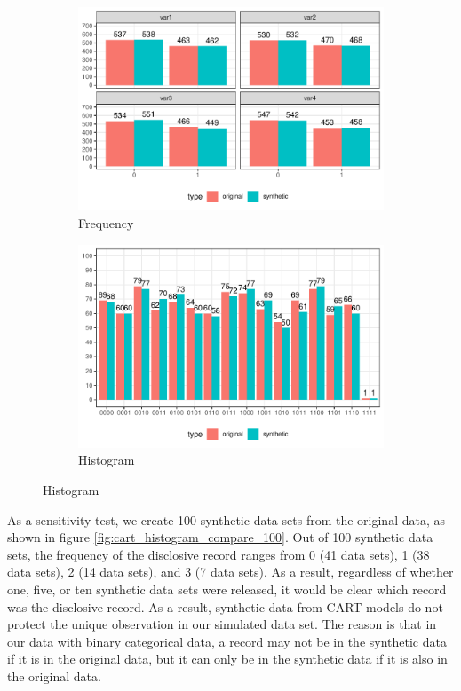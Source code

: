 \documentclass[runningheads]{llncs}
\begin{document}
\begin{figure}[!h]
    \centering
    \caption{Compare original and synthetic data}
    \begin{subfigure}{0.48\textwidth}
        \includegraphics[width=\textwidth]{../graphs/graph_cart_frequency_compare.pdf}
        \caption{Frequency}
        \label{fig:frequency_compare}
    \end{subfigure}
    \hfill
    \begin{subfigure}{0.48\textwidth}
        \includegraphics[width=\textwidth]{../graphs/graph_cart_histogram_compare.pdf}
        \caption{Histogram}
        \label{fig:histogram_compare}
    \end{subfigure}
    \label{fig:compare}
\end{figure}

As a sensitivity test, we create 100 synthetic data sets from the original data, as shown in figure \ref{fig:cart_histogram_compare_100}.  Out of 100 synthetic data sets, the frequency of the disclosive record ranges from 0 (41 data sets), 1 (38 data sets), 2 (14 data sets), and 3 (7 data sets).  As a result, regardless of whether one, five, or ten synthetic data sets were released, it would be clear which record was the disclosive record.  As a result, synthetic data from CART models do not protect the unique observation in our simulated data set.  The reason is that in our data with binary categorical data, a record may not be in the synthetic data if it is in the original data, but it can only be in the synthetic data if it is also in the original data.  
\end{document}
